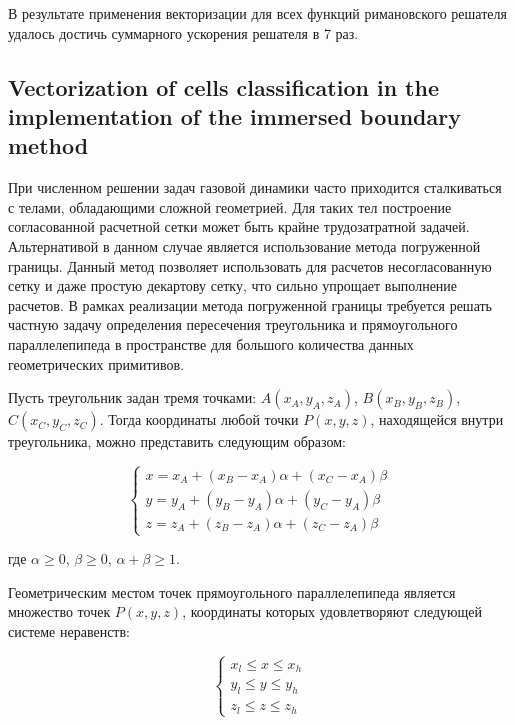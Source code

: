 \documentclass[
11pt,%
tightenlines,%
twoside,%
onecolumn,%
nofloats,%
nobibnotes,%
nofootinbib,%
superscriptaddress,%
noshowpacs,%
centertags]%
{revtex4}
\begin{document}
В результате применения векторизации для всех функций римановского решателя удалось достичь суммарного ускорения решателя в 7 раз.

\subsection{Vectorization of cells classification in the implementation of the immersed boundary method}

При численном решении задач газовой динамики часто приходится сталкиваться с телами, обладающими сложной геометрией.
Для таких тел построение согласованной расчетной сетки может быть крайне трудозатратной задачей.
Альтернативой в данном случае является использование метода погруженной границы.
Данный метод позволяет использовать для расчетов несогласованную сетку и даже простую декартову сетку, что сильно упрощает выполнение расчетов.
В рамках реализации метода погруженной границы требуется решать частную задачу определения пересечения треугольника и прямоугольного параллелепипеда в пространстве для большого количества данных геометрических примитивов.

Пусть треугольник задан тремя точками: $A(x_A, y_A, z_A)$, $B(x_B, y_B, z_B)$, $C(x_C, y_C, z_C)$.
Тогда координаты любой точки $P(x, y, z)$, находящейся внутри треугольника, можно представить следующим образом:

\begin{equation}
\begin{cases}
x = x_A + (x_B - x_A)\alpha + (x_C - x_A)\beta \\
y = y_A + (y_B - y_A)\alpha + (y_C - y_A)\beta \\
z = z_A + (z_B - z_A)\alpha + (z_C - z_A)\beta
\end{cases}
\end{equation}

где $\alpha \ge 0$, $\beta \ge 0$, $\alpha + \beta \ge 1$.

Геометрическим местом точек прямоугольного параллелепипеда является множество точек $P(x, y, z)$, координаты которых удовлетворяют следующей системе неравенств:

\begin{equation}
\begin{cases}
x_l \le x \le x_h \\
y_l \le y \le y_h \\
z_l \le z \le z_h
\end{cases}
\end{equation}
\end{document}
